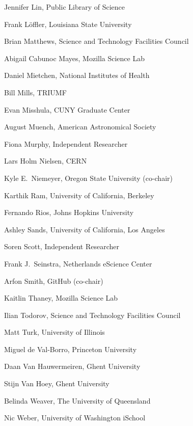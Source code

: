 \documentclass[11pt, oneside]{amsart}
\begin{document}
Jennifer Lin, Public Library of Science

Frank L\"offler, Louisiana State University

Brian Matthews, Science and Technology Facilities Council

Abigail Cabunoc Mayes, Mozilla Science Lab

Daniel Mietchen, National Institutes of Health

Bill Mills, TRIUMF

Evan Misshula, CUNY Graduate Center

August Muench, American Astronomical Society

Fiona Murphy, Independent Researcher

Lars Holm Nielsen, CERN

Kyle E.~Niemeyer, Oregon State University (co-chair)

Karthik Ram, University of California, Berkeley

Fernando Rios, Johns Hopkins University

Ashley Sands, University of California, Los Angeles

Soren Scott, Independent Researcher

Frank J.~Seinstra, Netherlands eScience Center

Arfon Smith, GitHub (co-chair)

Kaitlin Thaney, Mozilla Science Lab

Ilian Todorov, Science and Technology Facilities Council

Matt Turk, University of Illinois

Miguel de Val-Borro, Princeton University

Daan Van Hauwermeiren, Ghent University

Stijn Van Hoey, Ghent University

Belinda Weaver, The University of Queensland

Nic Weber, University of Washington iSchool



\end{document}
